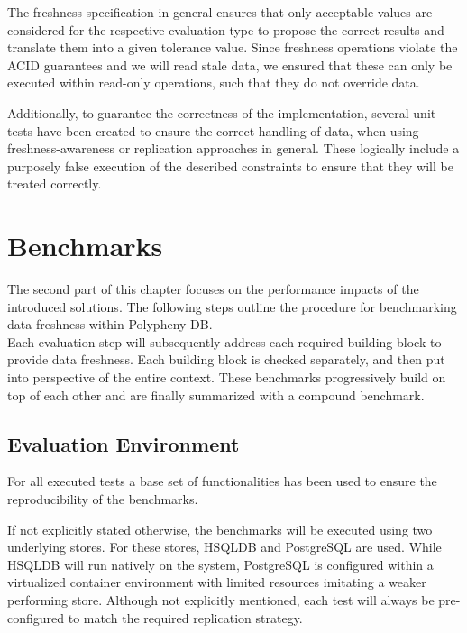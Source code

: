 The freshness specification in general ensures that only acceptable values are considered for the respective evaluation type to propose the correct results and translate them into
a given tolerance value.
Since freshness operations violate the ACID guarantees and we will read stale data, we ensured that these can only be executed within read-only operations, 
such that they do not override data.


Additionally, to guarantee the correctness of the implementation, several unit-tests have 
been created to ensure the correct handling of data, when using freshness-awareness or replication approaches in general.
These logically include a purposely false execution of the described constraints to ensure that they will be treated correctly.




\section{Benchmarks}

The second part of this chapter focuses on the performance impacts of the introduced solutions.
The following steps outline the procedure for benchmarking data freshness within Polypheny-DB.\\
Each evaluation step will subsequently address each required building block to provide data freshness.
Each building block is checked separately, and then put into perspective of the entire context.
These benchmarks progressively build on top of each other and are finally summarized with a compound benchmark.\\




\subsection{Evaluation Environment}
\label{sec:env}

For all executed tests a base set of functionalities has been used to ensure the reproducibility of the benchmarks.

If not explicitly stated otherwise, the benchmarks will be executed using two underlying stores.
For these stores, HSQLDB and PostgreSQL are used. While HSQLDB will run natively on the system, PostgreSQL is configured within a virtualized
container environment with limited resources imitating a weaker performing store.
Although not explicitly mentioned, each test will always be pre-configured to match the required replication strategy.





